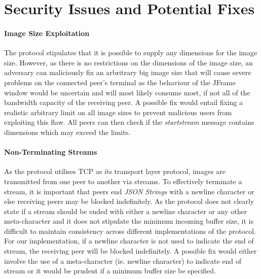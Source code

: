 \documentclass[10pt, twocolumn]{article}
\begin{document}
\section{Security Issues and Potential Fixes}
\paragraph{Image Size Exploitation}
The protocol stipulates that it is possible to supply any dimensions for the image size. However, as there is no restrictions on the dimensions of the image size, an adversary can maliciously fix an arbritrary big image size that will cause severe problems on the connected peer's terminal as the behaviour of the JFrame window would be uncertain and will most likely consume most, if not all of the bandwidth capacity of the receiving peer. A possible fix would entail fixing a realistic arbitrary limit on all image sizes to prevent malicious users from exploiting this flaw. All peers can then check if the \emph{startstream} message contains dimensions which may exceed the limits. 

\paragraph{Non-Terminating Streams}
As the protocol utilises TCP as its transport layer protocol, images are transmitted from one peer to another via streams. To effectively terminate a stream, it is important that peers end \emph{JSON Strings} with a newline character or else receiving peers may be blocked indefinitely. As the protocol does not clearly state if a stream should be ended with either a newline character or any other meta-character and it does not stipulate the minimum incoming buffer size, it is difficult to maintain consistency across different implementations of the protocol. For our implementation, if a newline character is not used to indicate the end of stream, the receiving peer will be blocked indefinitely. A possible fix would either involve the use of a meta-character (ie. newline character) to indicate end of stream or it would be prudent if a minimum buffer size be specified. 
\end{document}
